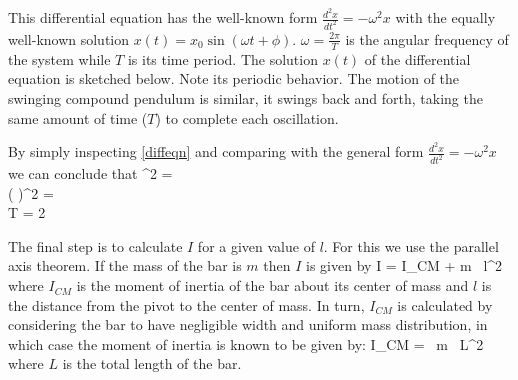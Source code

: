    This differential equation has the well-known form $\frac{d^2 x}{dt^2} = - \omega^2 x$ with the equally well-known solution $x(t) = x_0 \sin(\omega t + \phi)$. $\omega = \frac{2 \pi}{T}$ is the angular frequency of the system while $T$ is its time period. The solution $x(t)$ of the differential equation is sketched below. Note its periodic behavior. The motion of the swinging compound pendulum is similar, it swings back and forth, taking the same amount of time ($T$) to complete each oscillation.
   
   \vspace{0.5\baselineskip}
   
   \vspace{0.5\baselineskip}
   
   By simply inspecting \eqref{diffeqn} and comparing with the general form $\frac{d^2 x}{dt^2} = - \omega^2 x$ we can conclude that
   \beqc
      \omega^2 = \\
      \imply \big(  \big)^2 = \\
      \imply T = 2 \pi {}
   \eeqc



   The final step is to calculate $I$ for a given value of $l$. For this we use the parallel axis theorem. If the mass of the bar is $m$ then $I$ is given by
   \beq \label{parallel_axis}
      I = I_{CM} + m \, l^2
   \eeq
   where $I_{CM}$ is the moment of inertia of the bar about its center of mass and $l$ is the distance from the pivot to the center of mass. In turn, $I_{CM}$ is calculated by considering the bar to have negligible width and uniform mass distribution, in which case the moment of inertia is known to be given by:
   \beq \label{ICM}
      I_{CM} =  \, m \, L^2
   \eeq
   where $L$ is the total length of the bar.

